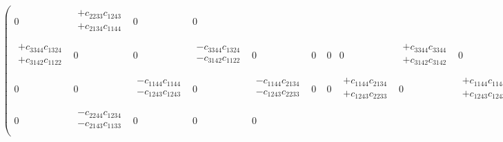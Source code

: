\begin{eqnarray}
\begin{pmatrix}
0 &
\begin{array}{l}
+c_{2233}c_{1243} \\
+c_{2134}c_{1144} \\
\end{array} &
0 &
0 \\
\begin{array}{l}
+c_{3344}c_{1324} \\
+c_{3142}c_{1122} \\
\end{array} &
0 &
0 &
\begin{array}{l}
-c_{3344}c_{1324} \\
-c_{3142}c_{1122} \\
\end{array} &
0 &
0 &
0 &
0 &
\begin{array}{l}
+c_{3344}c_{3344} \\
+c_{3142}c_{3142} \\
\end{array} &
0 &
0 &
\begin{array}{l}
-c_{3344}c_{3344} \\
-c_{3142}c_{3142} \\
\end{array} \\
0 &
0 &
\begin{array}{l}
-c_{1144}c_{1144} \\
-c_{1243}c_{1243} \\
\end{array} &
0 &
\begin{array}{l}
-c_{1144}c_{2134} \\
-c_{1243}c_{2233} \\
\end{array} &
0 &
0 &
\begin{array}{l}
+c_{1144}c_{2134} \\
+c_{1243}c_{2233} \\
\end{array} &
0 &
\begin{array}{l}
+c_{1144}c_{1144} \\
+c_{1243}c_{1243} \\
\end{array} &
0 &
0 \\
0 &
\begin{array}{l}
-c_{2244}c_{1234} \\
-c_{2143}c_{1133} \\
\end{array} &
0 &
0 &
0 &
\begin{array}{l}

\end{array}
\end{pmatrix}
\end{eqnarray}
